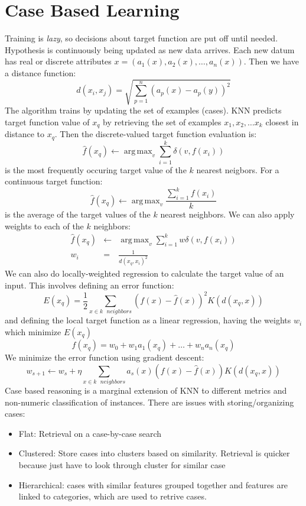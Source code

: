\documentclass[a4paper,10pt]{article}
\DeclareMathOperator*{\argmax}{arg\,max}
\begin{document}
\section{Case Based Learning}
Training is \emph{lazy}, so decisions about target function are put off until needed.  Hypothesis is continuously being updated as new data arrives.  Each new datum has real or discrete attributes $x = (a_1(x), a_2(x), \ldots, a_n(x))$.  Then we have a distance function:
$$
d(x_i, x_j) = \sqrt{\sum_{p=1}^n (a_p(x) - a_p(y))^2}
$$
The algorithm trains by updating the set of examples (cases).  KNN predicts target function value of $x_q$ by retrieving the set of examples $x_1, x_2, \ldots x_k$ closest in distance to $x_q$.  Then the discrete-valued target function evaluation is:
$$
\hat{f}(x_q) \leftarrow \argmax_{v}\sum_{i=1}^k \delta(v, f(x_i))
$$
is the most frequently occuring target value of the $k$ nearest neigbors.  For a continuous target function:
$$
\hat{f}(x_q) \leftarrow \argmax_v \frac{\sum_{i=1}^k f(x_i)}{k}
$$
is the average of the target values of the $k$ nearest neighbors.  We can also apply weights to each of the $k$ neighbors:
\begin{eqnarray}
\hat{f}(x_q) &\leftarrow& \argmax_v \sum_{i=1}^k w\delta(v, f(x_i)) \\
w_i &=& \frac{1}{d(x_q, x_i)^2}
\end{eqnarray}
We can also do locally-weighted regression to calculate the target value of an input.  This involves defining an error function:
$$
E(x_q) = \frac{1}{2}\sum_{x\in k\text{ }neighbors} (f(x) - \hat{f}(x))^2 K(d(x_q, x))
$$
and defining the local target function as a linear regression, having the weights $w_i$ which minimize $E(x_q)$
$$
\hat{f}(x_q) = w_0 + w_1 a_1(x_q) + \ldots + w_n a_n(x_q)
$$
We minimize the error function using gradient descent:
$$
w_{s+1} \leftarrow w_s + \eta \sum_{x\in k\text{ }neighbors} a_s(x)(f(x)-\hat{f}(x)) K(d(x_q, x))
$$
Case based reasoning is a marginal extension of KNN to different metrics and non-numeric classification of instances.  There are issues with storing/organizing cases:
\begin{itemize}
\item Flat: Retrieval on a case-by-case search
\item Clustered: Store cases into clusters based on similarity.  Retrieval is quicker because just have to look through cluster for similar case
\item Hierarchical: cases with similar features grouped together and features are linked to categories, which are used to retrive cases.
\end{itemize}
\end{document}
